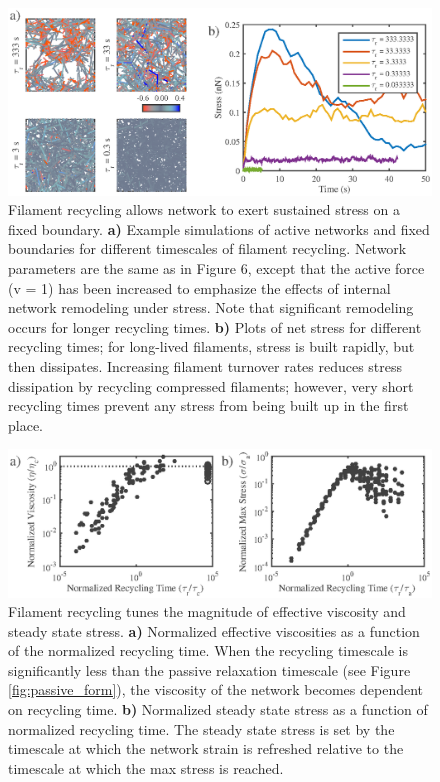 \documentclass[10pt,letterpaper]{article}
\begin{document}
\begin{figure}[h!]
\centering
\includegraphics[width=\hsize]{figures/figure5b}
\caption{\label{fig:active_rec}  Filament recycling allows network to exert sustained stress on a fixed boundary. \textbf{a)}  Example simulations of active networks and fixed boundaries for different timescales of filament recycling. Network parameters are the same as in Figure 6, except that the active force (v = 1) has been increased to emphasize the effects of internal network remodeling under stress. Note that significant remodeling occurs for longer recycling times.  \textbf{b)} Plots of net stress for different recycling times; for long-lived filaments, stress is built rapidly, but then dissipates.  Increasing filament turnover rates reduces stress dissipation by recycling compressed filaments; however, very short recycling times prevent any stress from being built up in the first place. }
\end{figure}


\begin{figure}[h!]
\centering
\includegraphics[width=\hsize]{figures/figure5S}
\caption{\label{fig:active_rec_form}  Filament recycling tunes the magnitude of effective viscosity and steady state stress. \textbf{a)}  Normalized effective viscosities as a function of the normalized recycling time. When the recycling timescale is significantly less than the passive relaxation timescale (see Figure \ref{fig:passive_form}), the viscosity of the network becomes dependent on recycling time.  \textbf{b)} Normalized steady state stress as a function of normalized recycling time.  The steady state stress is set by the timescale at which the network strain is refreshed relative to the timescale at which the max stress is reached. }
\end{figure}
\end{document}
